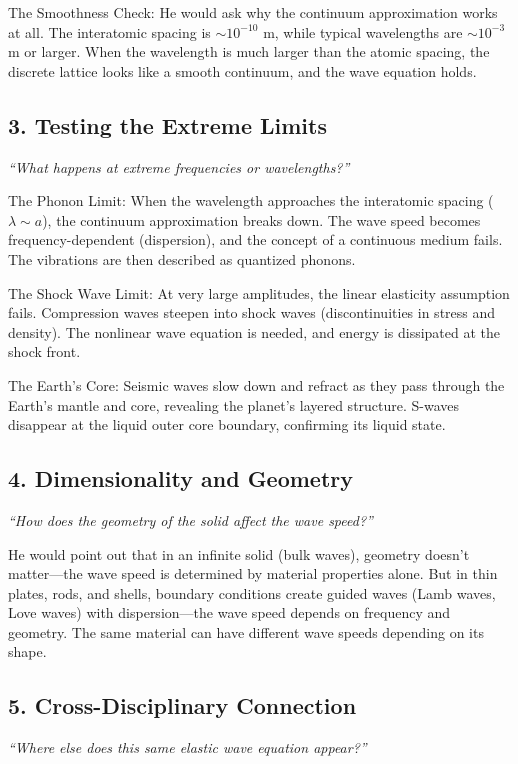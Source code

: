The Smoothness Check: He would ask why the continuum approximation works at all. The interatomic spacing is $\sim 10^{-10}$ m, while typical wavelengths are $\sim 10^{-3}$ m or larger. When the wavelength is much larger than the atomic spacing, the discrete lattice looks like a smooth continuum, and the wave equation holds.

\subsection*{3. Testing the Extreme Limits}
\textit{``What happens at extreme frequencies or wavelengths?''}

The Phonon Limit: When the wavelength approaches the interatomic spacing ($\lambda \sim a$), the continuum approximation breaks down. The wave speed becomes frequency-dependent (dispersion), and the concept of a continuous medium fails. The vibrations are then described as quantized phonons.

The Shock Wave Limit: At very large amplitudes, the linear elasticity assumption fails. Compression waves steepen into shock waves (discontinuities in stress and density). The nonlinear wave equation is needed, and energy is dissipated at the shock front.

The Earth's Core: Seismic waves slow down and refract as they pass through the Earth's mantle and core, revealing the planet's layered structure. S-waves disappear at the liquid outer core boundary, confirming its liquid state.

\subsection*{4. Dimensionality and Geometry}
\textit{``How does the geometry of the solid affect the wave speed?''}

He would point out that in an infinite solid (bulk waves), geometry doesn't matter---the wave speed is determined by material properties alone. But in thin plates, rods, and shells, boundary conditions create guided waves (Lamb waves, Love waves) with dispersion---the wave speed depends on frequency and geometry. The same material can have different wave speeds depending on its shape.

\subsection*{5. Cross-Disciplinary Connection}
\textit{``Where else does this same elastic wave equation appear?''}


